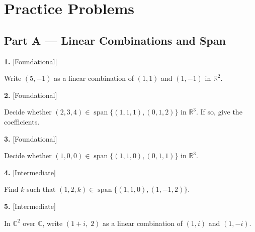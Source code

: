 \documentclass[11pt]{article}
\begin{document}
\section*{\large\color{ink} Practice Problems}
\subsection*{\normalsize\color{ink} Part A --- Linear Combinations and Span}
\begin{minipage}{\linewidth}\textbf{1.} \hfill{\scriptsize\color{ink}[Foundational]}\par\nopagebreak Write $(5,-1)$ as a linear combination of $(1,1)$ and $(1,-1)$ in $\mathbb{R}^{2}$.
\vspace{3.0cm}\end{minipage}\par\vspace{4pt}
\begin{minipage}{\linewidth}\textbf{2.} \hfill{\scriptsize\color{ink}[Foundational]}\par\nopagebreak Decide whether $(2,3,4)\in\operatorname{span}\{(1,1,1),(0,1,2)\}$ in $\mathbb{R}^{3}$. If so, give the coefficients.
\vspace{3.4cm}\end{minipage}\par\vspace{4pt}
\begin{minipage}{\linewidth}\textbf{3.} \hfill{\scriptsize\color{ink}[Foundational]}\par\nopagebreak Decide whether $(1,0,0)\in\operatorname{span}\{(1,1,0),(0,1,1)\}$ in $\mathbb{R}^{3}$.
\vspace{3.4cm}\end{minipage}\par\vspace{4pt}
\begin{minipage}{\linewidth}\textbf{4.} \hfill{\scriptsize\color{ink}[Intermediate]}\par\nopagebreak Find $k$ such that $(1,2,k)\in\operatorname{span}\{(1,1,0),(1,-1,2)\}$.
\vspace{3.6cm}\end{minipage}\par\vspace{4pt}
\begin{minipage}{\linewidth}\textbf{5.} \hfill{\scriptsize\color{ink}[Intermediate]}\par\nopagebreak In $\mathbb{C}^{2}$ over $\mathbb{C}$, write $(1+i,\;2)$ as a linear combination of $(1,i)$ and $(1,-i)$.
\vspace{4.4cm}\end{minipage}\par\vspace{4pt}
\end{document}
